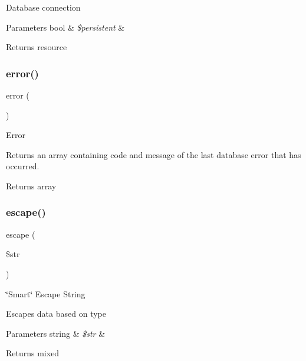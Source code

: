 Database connection


\begin{DoxyParams}[1]{Parameters}
bool & {\em \$persistent} & \\
\hline
\end{DoxyParams}
\begin{DoxyReturn}{Returns}
resource 
\end{DoxyReturn}
\mbox{\label{class_c_i___d_b__postgre__driver_a43b8d30b879d4f09ceb059b02af2bc02}} 
\subsubsection{\texorpdfstring{error()}{error()}}
{\footnotesize\ttfamily error (\begin{DoxyParamCaption}{ }\end{DoxyParamCaption})}

Error

Returns an array containing code and message of the last database error that has occurred.

\begin{DoxyReturn}{Returns}
array 
\end{DoxyReturn}
\mbox{\label{class_c_i___d_b__postgre__driver_ac8f37ca5703d4558c732e692194f8cd6}} 
\subsubsection{\texorpdfstring{escape()}{escape()}}
{\footnotesize\ttfamily escape (\begin{DoxyParamCaption}\item[{}]{\$str }\end{DoxyParamCaption})}

\char`\"{}\+Smart\char`\"{} Escape String

Escapes data based on type


\begin{DoxyParams}[1]{Parameters}
string & {\em \$str} & \\
\hline
\end{DoxyParams}
\begin{DoxyReturn}{Returns}
mixed 
\end{DoxyReturn}
\mbox{\label{class_c_i___d_b__postgre__driver_a90355121e1ed009e0efdbd544ab56efa}} 
